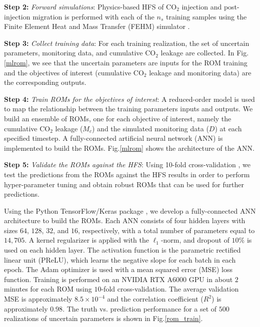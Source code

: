 \documentclass[10pt, twoside]{article}
\begin{document}
\textbf{Step 2:} \textit{Forward simulations}: Physics-based HFS of CO$_2$ injection and post-injection migration is performed with each of the $n_s$ training samples using the Finite Element Heat and Mass Transfer (FEHM) simulator \citep{Zyvoloski1997}. 

\textbf{Step 3:} \textit{Collect training data}: For each training realization, the set of uncertain parameters, monitoring data, and cumulative CO$_2$ leakage are collected. In Fig.\ref{mlrom}, we see that the uncertain parameters are inputs for the ROM training and the objectives of interest (cumulative CO$_2$ leakage and monitoring data) are the corresponding outputs. 

\textbf{Step 4:} \textit{Train ROMs for the objectives of interest}: A reduced-order model is used to map the relationship between the training parameters inputs and outputs. We build an ensemble of ROMs, one for each objective of interest, namely the cumulative CO$_2$ leakage ($M_c$) and the simulated monitoring data ($D$) at each specified timestep. A fully-connected artificial neural network (ANN) is implemented to build the ROMs. Fig.\ref{mlrom} shows the architecture of the ANN.

\textbf{Step 5:} \textit{Validate the ROMs against the HFS}: Using 10-fold cross-validation \citep{Xu2018249}, we test the predictions from the ROMs against the HFS results in order to perform hyper-parameter tuning and obtain robust ROMs that can be used for further predictions.


Using the Python TensorFlow/Keras package \citep{tensorflow2015-whitepaper, chollet2015keras}, we develop a fully-connected ANN architecture to build the ROMs. Each ANN consists of four hidden layers with sizes $64$, $128$, $32$, and $16$, respectively, with a total number of parameters equal to $14,705$. A kernel regularizer is applied with the $\ell_1$-norm, and dropout of $10\%$ is used on each hidden layer. The activation function is the parametric rectified linear unit (PReLU), which learns the negative slope for each batch in each epoch. The Adam optimizer \citep{Kingma2014Adam} is used with a mean squared error (MSE) loss function. Training is performed on an NVIDIA RTX A$6000$ GPU in about $2$ minutes for each ROM using $10$-fold cross-validation. The average validation MSE is approximately $8.5\times10^{-4}$ and the correlation coefficient ($R^2$) is approximately $0.98$. The truth vs. prediction performance for a set of $500$ realizations of uncertain parameters is shown in Fig.\ref{rom_train}.
\end{document}
